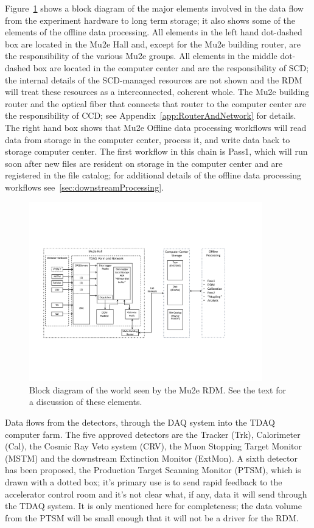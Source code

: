 Figure~\ref{fig:blockdiagram} shows a block diagram of the major elements involved
in the data flow from the experiment hardware to long term storage; it also shows
some of the elements of the offline data processing.
All elements in the left hand dot-dashed box are located in the Mu2e Hall
and, except for the Mu2e building router, are the responsibility of the various Mu2e groups.
All elements in the middle dot-dashed box are located in the computer center
and are the responsibility of SCD; the internal details of the SCD-managed resources
are not shown and the RDM will treat these resources as a interconnected, coherent whole.
The Mu2e building router and the optical fiber that connects that router
to the computer center are the responsibility of CCD;
see Appendix~\ref{app:RouterAndNetwork} for details.
The right hand box shows that Mu2e Offline data processing workflows
will read data from storage in the computer center,
process it,
and write data back to storage computer center.
The first workflow in this chain is Pass1, which will run soon after new files
are resident on storage in the computer center and are registered in the file catalog;
for additional details of the offline data processing workflows see~\ref{sec:downstreamProcessing}.

\begin{figure}[tbp]
\centering
\includegraphics[width=0.9\textwidth]{figures/interface_with_TDAQ.pdf}
\caption[Block diagram of interfaces seen by the Mu2e RDM]{
  Block diagram of the world seen by the Mu2e RDM.
  See the text for a discussion of these elements.}
\label{fig:blockdiagram}
\end{figure}

Data flows from the detectors, through the DAQ system into the TDAQ computer farm.
The five approved detectors are the Tracker (Trk), Calorimeter (Cal), the Cosmic Ray Veto system (CRV),
the Muon Stopping Target Monitor (MSTM) and the downstream Extinction Monitor (ExtMon).
A sixth detector has been proposed, the Production Target Scanning Monitor (PTSM),
which is drawn with a dotted box;
it's primary use is to send rapid feedback to the accelerator control room
and it's not clear what, if any, data it will send through the TDAQ system.
It is only mentioned here for completeness;
the data volume from the PTSM will be small enough that it will not be
a driver for the RDM.


